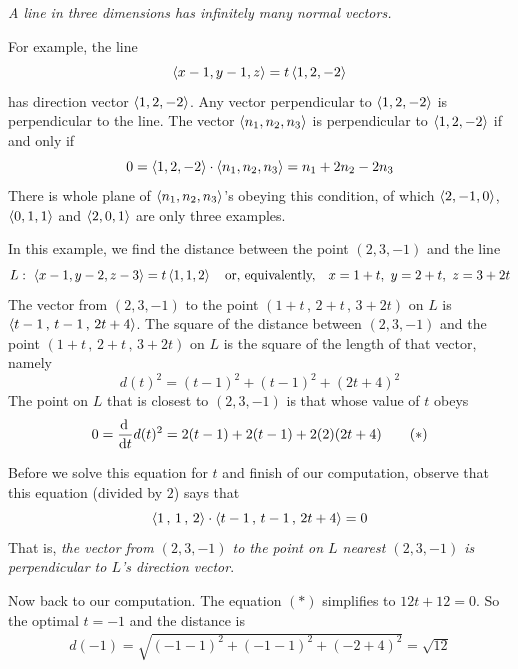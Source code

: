 \begin{warning}\label{warn line normal}
\emph{A line in three dimensions has infinitely many normal vectors.}

For example, the line
\begin{equation*}
\left< x-1,y-1,z\right>=t\left< 1,2,-2\right> 
\end{equation*}
has direction vector $\left< 1,2,-2\right>$. Any vector perpendicular to 
$\left< 1,2,-2\right> $
is perpendicular to the line. The vector $\left< n_1,n_2,n_3\right>$ is 
perpendicular to $\left< 1,2,-2\right>$ if and only if 
\begin{equation*}
0=\left< 1,2,-2\right> \cdot \left< n_1,n_2,n_3\right> = n_1+2n_2-2n_3
\end{equation*}
There is  whole plane of $\left< n_1,n_2,n_3\right>$'s obeying this condition,
of which $\left< 2,-1,0\right>$, $\left< 0,1,1\right>$ and $\left< 2,0,1\right>$ 
are only three examples.
\end{warning}

\begin{eg}\label{eg:VPdistance-point-line}
In this example, we find the distance between the point $(2,3,-1)$ and the line
\begin{equation*}
L:\  \left< x-1,y-2,z-3\right>=t\left< 1,1,2\right> \quad \text{or, equivalently,}\quad 
x=1+t,\ y=2+t,\ z=3+2t
\end{equation*}
The vector from $(2,3,-1)$ to the point $(1+t\,,\,2+t\,,\,3+2t)$ on $L$ is
$%
\llt t-1\,,\,t-1\,,\,2t+4\rgt$.
The square of the distance between $(2,3,-1)$ and the point 
$(1+t\,,\,2+t\,,\,3+2t)$  on $L$ is the square of the length of that vector, namely
\begin{equation*}
d(t)^2 = (t-1)^2 +(t-1)^2 +(2t+4)^2
\end{equation*}
The point on $L$ that is closest to $(2,3,-1)$ is that whose value of $t$
obeys
\begin{align*}
0= \diff{}{t} d(t)^2 = 2(t-1) +2(t-1) + 2(2)(2t+4)
\tag{$*$}\end{align*}

Before we solve this equation for $t$ and finish of our computation, observe
that this equation (divided by $2$) says that
\begin{equation*}
\left< 1\,,\,1\,,\,2\right>\cdot\left< t-1\,,\,t-1\,,\, 2t+4\right> = 0
\end{equation*}
That is, \emph{the vector from $(2,3,-1)$ to the point on $L$ nearest $(2,3,-1)$
is perpendicular to $L$'s direction vector}.

Now back to our computation. The equation $(*)$ simplifies to $12t+12=0$.
So the optimal $t=-1$ and the distance is
\begin{align*}
d(-1) =\sqrt{(-1-1)^2+(-1-1)^2+(-2+4)^2}
=\sqrt{12}
\end{align*}

\end{eg}

